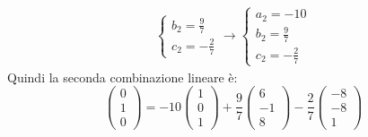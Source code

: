 \documentclass[a4paper]{article}
\begin{document}
\begin{itemize}
\begin{equation*}
\begin{array}{l}
\begin{cases}
					b_{2} = \frac{9}{7} \\
					c_{2} = -\frac{2}{7}
				\end{cases} \rightarrow
				\begin{cases}
					a_{2} = -10 \\
					b_{2} = \frac{9}{7} \\
					c_{2} = -\frac{2}{7}
				\end{cases}
			\end{array}
		\end{equation*}
		Quindi la seconda combinazione lineare è:
		\begin{equation*}
			\begin{pmatrix}
				0 \\ 1 \\ 0
			\end{pmatrix} =
			-10 \begin{pmatrix}
				1 \\ 0 \\ 1
			\end{pmatrix} +
			\dfrac{9}{7} \begin{pmatrix}
				6 \\ -1 \\ 8
			\end{pmatrix} -
			\dfrac{2}{7} \begin{pmatrix}
				-8 \\ -8 \\ 1
			\end{pmatrix}
		\end{equation*}
		

\end{itemize}
\end{document}
